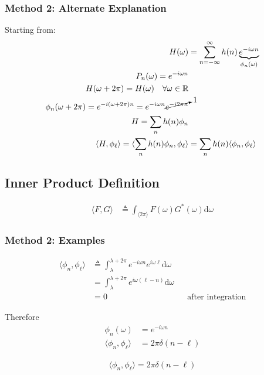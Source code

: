 \subsubsection{Method 2: Alternate Explanation}
Starting from:
\begin{align*}
    H(\omega)
    &=\sum_{n=-\infty}^\infty h(n) \underbrace{e^{-i\omega n}}_{\phi_n(\omega)}
    \\
    P_n(\omega) = e^{-i\omega n}
    \\
    H(\omega+2\pi)=H(\omega)\quad\forall\omega\in\mathbb R
    \\
    \phi_n(\omega+2\pi)=e^{-i(\omega+2\pi)n} = e^{-i\omega n} \cancelto1{e^{-i2\pi n}}
    \\
    H = \sum_n h(n) \phi_n
    \\
    \langle H,\phi_\ell\rangle
    =
    \langle \sum_n h(n)\phi_n,\phi_\ell\rangle
    &= 
    \sum_n h(n)\langle \phi_n,\phi_\ell\rangle
\end{align*}

\subsection{Inner Product Definition}
\begin{align*}
    \langle F, G\rangle 
    &\triangleq \int_{\langle2\pi\rangle} F(\omega)G^\ast(\omega)\mathrm d\omega
\end{align*}

\subsubsection{Method 2: Examples}
\begin{align*}
    \langle \phi_n, \phi_\ell \rangle 
    &\triangleq 
    \int_{\lambda}^{\lambda+2\pi} e^{-i\omega n} e^{i\omega\ell} \mathrm d\omega
    \\
    &=
    \int_{\lambda}^{\lambda+2\pi} e^{i\omega(\ell-n)} \mathrm d\omega
    \\
    &= 0 &&\text{after integration}
\end{align*}

Therefore
\begin{align*}
    \phi_n(\omega)
    &=e^{-i\omega n}
    \\
    \langle \phi_n, \phi_\ell \rangle 
    &= 2\pi\delta(n-\ell)
\end{align*}

\hrulefill

\begin{align*}
    \langle \phi_n, \phi_\ell \rangle  = 2\pi\delta(n-\ell)
\end{align*}

